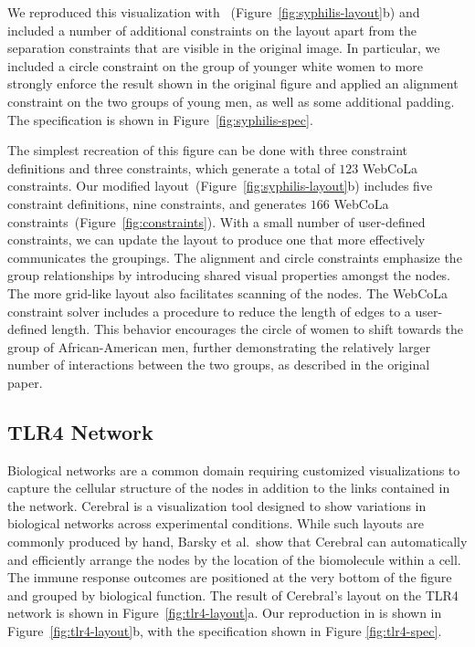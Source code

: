 We reproduced this visualization with \projectname~(Figure~\ref{fig:syphilis-layout}b) 
and included a number of additional constraints on the layout apart
from the separation constraints that are visible in the original image. In
particular, we included a circle constraint on the group of younger white
women to more strongly enforce the result shown in the original figure and
applied an alignment constraint on the two groups of young
men, as well as some additional padding. The \projectname specification
is shown in Figure~\ref{fig:syphilis-spec}.

The simplest recreation of this figure can be done with three constraint
definitions and three \projectname constraints, which generate a total of
$123$ WebCoLa constraints.
Our modified layout~(Figure~\ref{fig:syphilis-layout}b) includes 
five constraint definitions, nine \projectname constraints, and generates 
$166$ WebCoLa constraints~(Figure~\ref{fig:constraints}). With a small 
number of user-defined constraints, we can update the layout to produce
one that more effectively communicates the groupings. The
alignment and circle constraints emphasize the group relationships by
introducing shared visual properties amongst the nodes. The more grid-like
layout also facilitates scanning of the nodes. The
WebCoLa constraint solver includes a procedure to reduce the length of
edges to a user-defined length. This behavior encourages the circle of women
to shift towards the group of African-American men, further demonstrating
the relatively larger number of interactions between the two groups,
as described in the original paper.

\subsection{TLR4 Network}
\tlrfourSpec
Biological networks are a common domain requiring customized visualizations
to capture the cellular structure of the nodes in addition to the links
contained in the network. Cerebral \cite{barsky2008cerebral} is a visualization
tool designed to show variations in biological networks across experimental
conditions. While such layouts are commonly produced by hand, Barsky et al.\ show that 
Cerebral can automatically and efficiently arrange the nodes by the location
of the biomolecule within a cell. The immune response outcomes are positioned
at the very bottom of the figure and grouped by biological function. The result
of Cerebral's layout on the TLR4 network is shown in Figure~\ref{fig:tlr4-layout}a.
Our reproduction in \projectname is shown in Figure~\ref{fig:tlr4-layout}b,
with the specification shown in Figure \ref{fig:tlr4-spec}.

